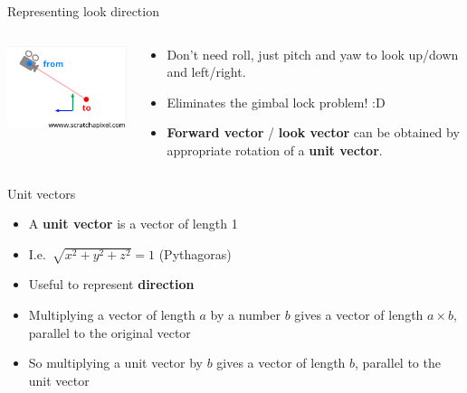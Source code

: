 \begin{frame}{Representing look direction}
	\begin{columns}
		\pause
		\begin{column}{0.48\textwidth}
			\includegraphics[width=\textwidth]{look_at}
		\end{column}
		\begin{column}{0.48\textwidth}
			\begin{itemize}
				\pause\item Don't need roll, just pitch and yaw to look up/down and left/right.
				\pause\item Eliminates the gimbal lock problem! :D
				\pause\item \textbf{Forward vector} / \textbf{look vector} can be obtained by appropriate rotation of a \textbf{unit vector}.
			\end{itemize}
		\end{column}
	\end{columns}
\end{frame}

\begin{frame}{Unit vectors}
	\begin{itemize}
		\pause\item A \textbf{unit vector} is a vector of length 1
		\pause\item I.e.\ $\sqrt{x^2 + y^2 + z^2} = 1$ (Pythagoras)
		\pause\item Useful to represent \textbf{direction}
		\pause\item Multiplying a vector of length $a$ by a number $b$ gives a vector of length $a \times b$,
			parallel to the original vector
		\pause\item So multiplying a unit vector by $b$ gives a vector of length $b$,
			parallel to the unit vector		
	\end{itemize}
\end{frame}


